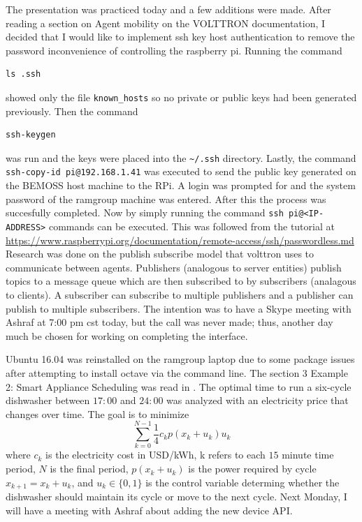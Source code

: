 \documentclass[fontsize=11pt, %
                             paper=letter, %
                             twoside, %
                             captions=tableheading,
                             index=totoc,
                             hyperref]{labbook}
\begin{document}
\begin{addmargin}[0cm]{0cm}
The presentation was practiced today and a few additions were made. After reading a section on Agent mobility on the VOLTTRON documentation, I decided that I would like to implement ssh key host authentication to remove the password inconvenience of controlling the raspberry pi. Running the command 
\begin{verbatim}
ls .ssh
\end{verbatim}
showed only the file \texttt{known\_hosts} so no private or public keys had been generated previously. Then the command
\begin{verbatim}
ssh-keygen
\end{verbatim}
was run and the keys were placed into the \texttt{\textasciitilde/.ssh} directory. Lastly, the command \texttt{ssh-copy-id pi@192.168.1.41} was executed to send the public key generated on the BEMOSS host machine to the RPi. A login was prompted for and the system password of the ramgroup machine was entered. After this the process was succesfully completed. Now by simply running the command \texttt{ssh pi@<IP-ADDRESS>} commands can be executed. This was followed from the tutorial at \\
\url{https://www.raspberrypi.org/documentation/remote-access/ssh/passwordless.md}\\

Research was done on the publish subscribe model that volttron uses to communicate between agents. Publishers (analogous to server entities) publish topics to a message queue which are then subscribed to by subscribers (analagous to clients). A subscriber can subscribe to multiple publishers and a publisher can publish to multiple subscribers. The intention was to have a Skype meeting with Ashraf at 7:00 pm cst today, but the call was never made; thus, another day much be chosen for working on completing the interface.


Ubuntu 16.04 was reinstalled on the ramgroup laptop due to some package issues after attempting to install octave via the command line. The section 3 Example 2: Smart Appliance Scheduling was read in \cite{ch05dynamicprogramming}. The optimal time to run a six-cycle dishwasher between $17:00$ and $24:00$ was analyzed with an electricity price that changes over time. The goal is to minimize
\[
	\sum_{k=0}^{N-1}\frac{1}{4}c_{k} p(x_k+u_k)u_k	
\]
where $c_k$ is the electricity cost in USD/kWh, k refers to each $15$ minute time period, $N$ is the final period, $p(x_k+u_k)$ is the power required by cycle $x_{k+1}=x_k+u_k$, and $u_k \in \{0,1\}$ is the control variable determing whether the dishwasher should maintain its cycle or move to the next cycle.
\bigbreak\noindent
Next Monday, I will have a meeting with Ashraf about adding the new device API.


\end{addmargin}
\end{document}
